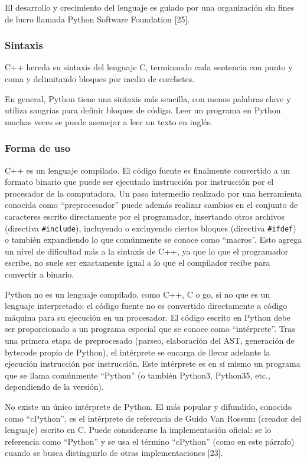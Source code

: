 \documentclass[]{article}
\begin{document}
El desarrollo y crecimiento del lenguaje es guiado por una organización sin
fines de lucro llamada Python Software Foundation [25].

\subsubsection{Sintaxis}

C++ hereda su sintaxis del lenguaje C, terminando cada sentencia con punto y
coma y delimitando bloques por medio de corchetes. 

En general, Python tiene una sintaxis más sencilla, con menos palabras clave y
utiliza sangrías para definir bloques de código. Leer un programa en Python
muchas veces se puede asemejar a leer un texto en inglés.

\subsubsection{Forma de uso}

C++ es un lenguaje compilado. El código fuente es finalmente convertido a un
formato binario que puede ser ejecutado instrucción por instrucción por el
procesador de la computadora. Un paso intermedio realizado por una herramienta
conocida como ``preprocesador'' puede además realizar cambios en el conjunto de
caracteres escrito directamente por el programador, insertando otros archivos
(directiva \verb!#include!), incluyendo o excluyendo ciertos bloques (directiva
\verb!#ifdef!) o también expandiendo lo que comúnmente se conoce como ``macros''.
Esto agrega un nivel de dificultad más a la sintaxis de C++, ya que lo que el
programador escribe, no suele ser exactamente igual a lo que el compilador
recibe para convertir a binario.

Python no es un lenguaje compilado, como C++, C o go, si no que es un lenguaje
interpretado: el código fuente no es convertido directamente a código máquina
para su ejecución en un procesador. El código escrito en Python debe ser
proporcionado a un programa especial que se conoce como ``intérprete''. Tras
una primera etapa de preprocesado (parseo, elaboración del AST, generación de
bytecode propio de Python), el intérprete se encarga de llevar adelante la
ejecución instrucción por instrucción. Este intérprete es en sí mismo un
programa que se llama comúnmente ``Python'' (o también Python3, Python35,
etc., dependiendo de la versión).

No existe un único intérprete de Python. El más popular y difundido, conocido
como ``cPython'', es el intérprete de referencia de Guido Van Rossum (creador
del lenguaje) escrito en C. Puede considerarse la implementación oficial: se lo
referencia como ``Python'' y se usa el término ``cPython'' (como en este
párrafo) cuando se busca distinguirlo de otras implementaciones [23].
\end{document}
